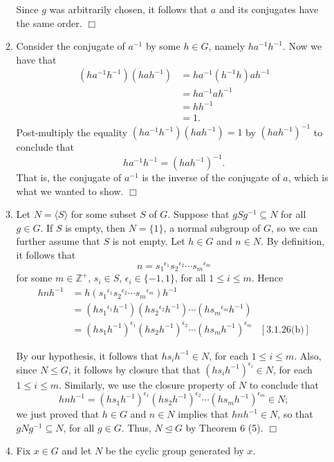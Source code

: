 \documentclass[9pt]{article}
\newcommand{\qed}{\hfill \ensuremath{\Box}}
\newcommand{\cyc}[1]{\langle #1 \rangle}
\newcommand{\Z}{\mathbb{Z}}
\begin{document}
\begin{enumerate}
\begin{enumerate}
            Since $g$ was arbitrarily chosen, it follows that $a$ and its
            conjugates have the same order. \qed
      \item Consider the conjugate of $a^{-1}$ by some $h \in G$, namely
            $ha^{-1}h^{-1}$. Now we have that
            \begin{align*}
               (ha^{-1}h^{-1})(hah^{-1}) &= ha^{-1}(h^{-1}h)ah^{-1} \\
                  &= ha^{-1}ah^{-1} \\
                  &= hh^{-1} \\
                  &= 1.
            \end{align*}
            Post-multiply the equality $(ha^{-1}h^{-1})(hah^{-1}) = 1$ by
            $(hah^{-1})^{-1}$ to conclude that
            $$ha^{-1}h^{-1} = (hah^{-1})^{-1}.$$
            That is, the conjugate of $a^{-1}$ is the inverse of the conjugate 
            of $a$, which is what we wanted to show. \qed
      \item Let $N = \cyc{S}$ for some subset $S$ of $G$. Suppose that
            $gSg^{-1} \subseteq N$ for all $g \in G$. If $S$ is empty, then
            $N = \{1\}$, a normal subgroup of $G$, so we can further assume that
            $S$ is not empty. Let $h \in G$ and $n \in N$. By definition, it
            follows that
            $$n = {s_1}^{\epsilon_1}{s_2}^{\epsilon_2}\cdots{s_m}^{\epsilon_m}$$
            for some $m \in \Z^+$, $s_i \in S$, $\epsilon_i \in \{-1, 1\}$,
            for all $1 \le i \le m$. Hence
            \begin{align*}
               hnh^{-1} &= h({s_1}^{\epsilon_1}{s_2}^{\epsilon_2}
                  \cdots{s_m}^{\epsilon_m})h^{-1} \\
                  &= (h{s_1}^{\epsilon_1}h^{-1})(h{s_2}^{\epsilon_2}h^{-1})
                  \cdots(h{s_m}^{\epsilon_m}h^{-1}) \\
                  &= (hs_1h^{-1})^{\epsilon_1}(hs_2h^{-1})^{\epsilon_2}
                  \cdots(hs_mh^{-1})^{\epsilon_m} &[3.1.26\text{(b)}]
            \end{align*}

            By our hypothesis, it follows that $hs_ih^{-1} \in N$, for each
            $1 \le i \le m$. Also, since $N \le G$, it follows by closure that
            that $(hs_ih^{-1})^{\epsilon_i} \in N$, for each $1 \le i \le m$. 
            Similarly, we use the closure property of $N$ to conclude that
            $$hnh^{-1} = (hs_1h^{-1})^{\epsilon_1}(hs_2h^{-1})^{\epsilon_2}
              \cdots(hs_mh^{-1})^{\epsilon_m} \in N;$$
            we just proved that $h \in G$ and $n \in N$ implies that
            $hnh^{-1} \in N$, so that $gNg^{-1} \subseteq N$, for all $g \in G$.
            Thus, $N \trianglelefteq G$ by Theorem 6 (5). \qed
      \item Fix $x \in G$ and let $N$ be the cyclic group generated by $x$.


\end{enumerate}
\end{enumerate}
\end{document}
